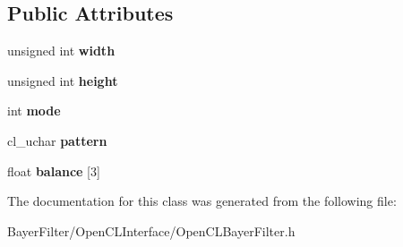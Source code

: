 \subsection*{Public Attributes}
\begin{DoxyCompactItemize}
\item 
\hypertarget{class_open_c_l_bayer_filter_params_a5d7d8c8ffa8213863e739b99b6af1640}{unsigned int {\bfseries width}}\label{class_open_c_l_bayer_filter_params_a5d7d8c8ffa8213863e739b99b6af1640}

\item 
\hypertarget{class_open_c_l_bayer_filter_params_af558d87c3920a91295893b3e705a4514}{unsigned int {\bfseries height}}\label{class_open_c_l_bayer_filter_params_af558d87c3920a91295893b3e705a4514}

\item 
\hypertarget{class_open_c_l_bayer_filter_params_a9b81a8d9b0f7b839ba08bf747cea8b3f}{int {\bfseries mode}}\label{class_open_c_l_bayer_filter_params_a9b81a8d9b0f7b839ba08bf747cea8b3f}

\item 
\hypertarget{class_open_c_l_bayer_filter_params_a6be2881bda72ee46da0edb8a2083ed09}{cl\-\_\-uchar {\bfseries pattern}}\label{class_open_c_l_bayer_filter_params_a6be2881bda72ee46da0edb8a2083ed09}

\item 
\hypertarget{class_open_c_l_bayer_filter_params_a82211a12b0eb7eb0b91a4f28bc3b71cd}{float {\bfseries balance} \mbox{[}3\mbox{]}}\label{class_open_c_l_bayer_filter_params_a82211a12b0eb7eb0b91a4f28bc3b71cd}

\end{DoxyCompactItemize}


The documentation for this class was generated from the following file\-:\begin{DoxyCompactItemize}
\item 
Bayer\-Filter/\-Open\-C\-L\-Interface/Open\-C\-L\-Bayer\-Filter.\-h\end{DoxyCompactItemize}
